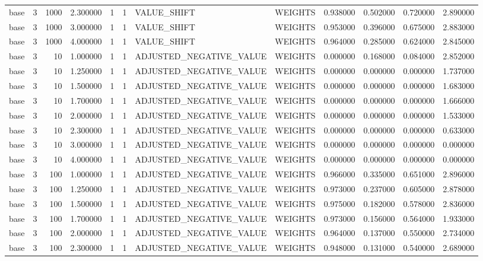 \begin{tabular}{lrrrllllrrrr}
base & 3 & 1000 & 2.300000 & 1 & 1 & VALUE_SHIFT & WEIGHTS & 0.938000 & 0.502000 & 0.720000 & 2.890000 \\
base & 3 & 1000 & 3.000000 & 1 & 1 & VALUE_SHIFT & WEIGHTS & 0.953000 & 0.396000 & 0.675000 & 2.883000 \\
base & 3 & 1000 & 4.000000 & 1 & 1 & VALUE_SHIFT & WEIGHTS & 0.964000 & 0.285000 & 0.624000 & 2.845000 \\
base & 3 & 10 & 1.000000 & 1 & 1 & ADJUSTED_NEGATIVE_VALUE & WEIGHTS & 0.000000 & 0.168000 & 0.084000 & 2.852000 \\
base & 3 & 10 & 1.250000 & 1 & 1 & ADJUSTED_NEGATIVE_VALUE & WEIGHTS & 0.000000 & 0.000000 & 0.000000 & 1.737000 \\
base & 3 & 10 & 1.500000 & 1 & 1 & ADJUSTED_NEGATIVE_VALUE & WEIGHTS & 0.000000 & 0.000000 & 0.000000 & 1.683000 \\
base & 3 & 10 & 1.700000 & 1 & 1 & ADJUSTED_NEGATIVE_VALUE & WEIGHTS & 0.000000 & 0.000000 & 0.000000 & 1.666000 \\
base & 3 & 10 & 2.000000 & 1 & 1 & ADJUSTED_NEGATIVE_VALUE & WEIGHTS & 0.000000 & 0.000000 & 0.000000 & 1.533000 \\
base & 3 & 10 & 2.300000 & 1 & 1 & ADJUSTED_NEGATIVE_VALUE & WEIGHTS & 0.000000 & 0.000000 & 0.000000 & 0.633000 \\
base & 3 & 10 & 3.000000 & 1 & 1 & ADJUSTED_NEGATIVE_VALUE & WEIGHTS & 0.000000 & 0.000000 & 0.000000 & 0.000000 \\
base & 3 & 10 & 4.000000 & 1 & 1 & ADJUSTED_NEGATIVE_VALUE & WEIGHTS & 0.000000 & 0.000000 & 0.000000 & 0.000000 \\
base & 3 & 100 & 1.000000 & 1 & 1 & ADJUSTED_NEGATIVE_VALUE & WEIGHTS & 0.966000 & 0.335000 & 0.651000 & 2.896000 \\
base & 3 & 100 & 1.250000 & 1 & 1 & ADJUSTED_NEGATIVE_VALUE & WEIGHTS & 0.973000 & 0.237000 & 0.605000 & 2.878000 \\
base & 3 & 100 & 1.500000 & 1 & 1 & ADJUSTED_NEGATIVE_VALUE & WEIGHTS & 0.975000 & 0.182000 & 0.578000 & 2.836000 \\
base & 3 & 100 & 1.700000 & 1 & 1 & ADJUSTED_NEGATIVE_VALUE & WEIGHTS & 0.973000 & 0.156000 & 0.564000 & 1.933000 \\
base & 3 & 100 & 2.000000 & 1 & 1 & ADJUSTED_NEGATIVE_VALUE & WEIGHTS & 0.964000 & 0.137000 & 0.550000 & 2.734000 \\
base & 3 & 100 & 2.300000 & 1 & 1 & ADJUSTED_NEGATIVE_VALUE & WEIGHTS & 0.948000 & 0.131000 & 0.540000 & 2.689000 \\

\end{tabular}

